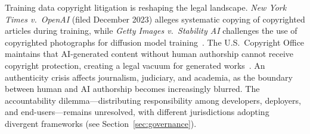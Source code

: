 Training data copyright litigation is reshaping the legal landscape. \emph{New York Times v.\ OpenAI} (filed December 2023) alleges systematic copying of copyrighted articles during training, while \emph{Getty Images v.\ Stability AI} challenges the use of copyrighted photographs for diffusion model training~\cite{nytvopenai2023,gettyvstability2023}. The U.S.\ Copyright Office maintains that AI-generated content without human authorship cannot receive copyright protection, creating a legal vacuum for generated works~\cite{usco2023}. An authenticity crisis affects journalism, judiciary, and academia, as the boundary between human and AI authorship becomes increasingly blurred. The accountability dilemma---distributing responsibility among developers, deployers, and end-users---remains unresolved, with different jurisdictions adopting divergent frameworks (see Section~\ref{sec:governance}).

\begin{figure}[htbp]
\centering
{}
\end{figure}

